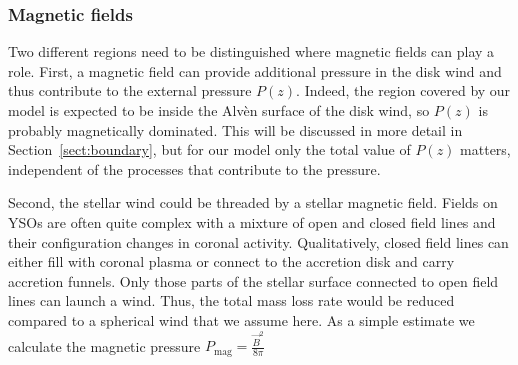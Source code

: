 \subsubsection{Magnetic fields}
Two different regions need to be distinguished where magnetic fields can play a role. First, a magnetic field can provide additional pressure in the disk wind and thus contribute to the external pressure $P(z)$. Indeed, the region covered by our model is expected to be inside the Alv\`en surface of the disk wind, so $P(z)$ is probably magnetically dominated. This will be discussed in more detail in Section~\ref{sect:boundary}, but for our model only the total value of $P(z)$ matters, independent of the processes that contribute to the pressure. 

Second, the stellar wind could be threaded by a stellar magnetic field. Fields on YSOs are often quite complex with a mixture of open and closed field lines \citep[e.g.][]{2011MNRAS.417..472D,2012MNRAS.425.2948D} and their configuration changes in coronal activity.
Qualitatively, closed field lines can either fill with coronal plasma or connect to the accretion disk and carry accretion funnels. Only those parts of the stellar surface connected to open field lines can launch a wind. Thus, the total mass loss rate would be reduced compared to a spherical wind that we assume here. 
As a simple estimate we calculate the magnetic pressure $P_{\textrm{mag}}=\frac{\vec B^2}{8 \pi}$ %



